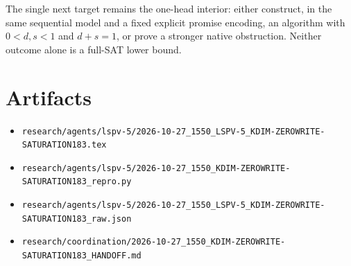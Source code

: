 \documentclass[11pt]{article}
\begin{document}
The single next target remains the one-head interior: either construct, in
the same sequential model and a fixed explicit promise encoding, an algorithm
with $0<d,s<1$ and $d+s=1$, or prove a stronger native obstruction.  Neither
outcome alone is a full-SAT lower bound.

\section*{Artifacts}
\begin{itemize}
\item \texttt{research/agents/lspv-5/2026-10-27\_1550\_LSPV-5\_KDIM-ZEROWRITE-SATURATION183.tex}
\item \texttt{research/agents/lspv-5/2026-10-27\_1550\_KDIM-ZEROWRITE-SATURATION183\_repro.py}
\item \texttt{research/agents/lspv-5/2026-10-27\_1550\_LSPV-5\_KDIM-ZEROWRITE-SATURATION183\_raw.json}
\item \texttt{research/coordination/2026-10-27\_1550\_KDIM-ZEROWRITE-SATURATION183\_HANDOFF.md}
\end{itemize}

\end{document}
